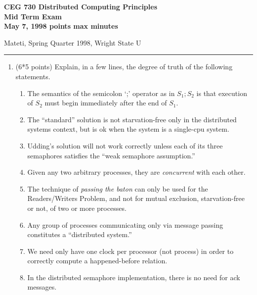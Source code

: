 \def\fat{\framebox[1mm]{\rule{0mm}{2mm}}}
\def\rar{\rightarrow}
\def\pr{$\parallel$}
\def\CSP{{\sc csp}}
\def\RPC{{\sc rpc}}
\parindent=0pt



{\bf CEG 
\large \bf 730 Distributed Computing Principles\\[5pt]
\large Mid Term Exam\\[10pt]
May 7, 1998  points max  minutes\\
}

\bigskip
{Mateti,  Spring Quarter 1998, Wright State U}\\[-5pt]
\hrule

\begin{enumerate}

\item (6*5 points)
Explain, in a few lines, the degree of truth of the following
statements.

\begin{enumerate}

\item
The semantics of the semicolon `;' operator as in $S_1 ; S_2$
is that execution of $S_2$ must begin immediately after the
end of $S_1$.

\item 
The ``standard'' solution  \quad is not
starvation-free only in the distributed systems context, but is
ok when the system is a single-cpu system.

\item
Udding's solution will not work correctly unless each of its three
semaphores satisfies the ``weak semaphore assumption.''

\item
Given any two arbitrary processes, they are {\em concurrent}
with each other.

\item
The technique of {\em passing the baton} can only be used for the
Readers/Writers Problem, and not for mutual exclusion, starvation-free
or not, of two or more processes.

\item Any group of processes communicating only via message passing
constitutes a ``distributed system.''

\item We need only have one clock per processor (not process)
in order to correctly compute a happened-before relation.

\item
In the distributed semaphore implementation, there is no need for {\sc ack}
messages.


\end{enumerate}
\end{enumerate}
